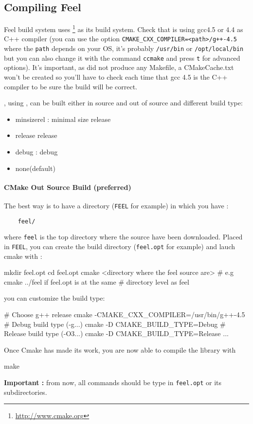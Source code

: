 \subsection{Compiling Feel}
\label{compilingfeel}
Feel build system uses \cmake{}\footnote{\url{http://www.cmake.org}}
as its build system. Check that \cmake is using gcc4.5 or 4.4 as C++ compiler
(you can use the option \lstinline|CMAKE_CXX_COMPILER=<path>/g++-4.5| where the
\lstinline|path| depends on your OS, it's probably \lstinline|/usr/bin| or
\lstinline|/opt/local/bin| but you can also change it with the command \lstinline|ccmake|
and press \lstinline|t| for advanced options).  It's important, as \cmake did
not produce any Makefile, a CMakeCache.txt won't be created so you'll have to
check each time that gcc 4.5 is the C++ compiler to be sure the build will be
correct.

\feel, using \cmake, can be built either in source and out of source and different
build type:
\begin{itemize}
\item minsizerel : minimal size release
\item release release
\item debug : debug
\item none(default)
\end{itemize}

\paragraph{CMake Out Source Build (preferred)}
The best way is to have a directory (\lstinline|FEEL| for example) in which you have : \\
\begin{lstlisting}
	feel/
\end{lstlisting}
where \lstinline|feel| is the top directory where the source have been downloaded. Placed in \lstinline|FEEL|, you can create the build directory (\lstinline|feel.opt| for example) and lauch cmake with :
\begin{unixcom}
  mkdir feel.opt
  cd feel.opt
  cmake <directory where the feel source are>
  # e.g cmake ../feel if feel.opt is at the same
  # directory level as feel
\end{unixcom}
you can customize the build type:
\begin{unixcom}
  # Choose g++ release
  cmake -CMAKE_CXX_COMPILER=/usr/bin/g++-4.5
  # Debug build type (-g...)
  cmake -D CMAKE_BUILD_TYPE=Debug
  # Release build type (-O3...)
  cmake -D CMAKE_BUILD_TYPE=Release
  ...
\end{unixcom}
Once Cmake has made its work, you are now able to compile the library with
\begin{unixcom}
		make
\end{unixcom}
\textbf{Important :} from now, all commands should be type in \lstinline|feel.opt| or its subdirectories.

